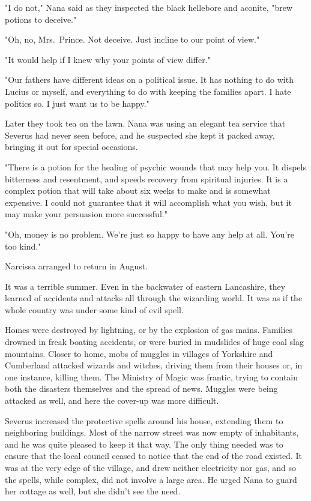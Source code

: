 "I do not," Nana said as they inspected the black hellebore and aconite, "brew potions to deceive."

"Oh, no, Mrs.~Prince. Not deceive. Just incline to our point of view."

"It would help if I knew why your points of view differ."

"Our fathers have different ideas on a{\el} political issue. It has nothing to do with Lucius or myself, and everything to do with keeping the families apart. I hate politics so. I just want us to be happy."

Later they took tea on the lawn. Nana was using an elegant tea service that Severus had never seen before, and he suspected she kept it packed away, bringing it out for special occasions.

"There is a potion for the healing of psychic wounds that may help you. It dispels bitterness and resentment, and speeds recovery from spiritual injuries. It is a complex potion that will take about six weeks to make and is somewhat expensive. I could not guarantee that it will accomplish what you wish, but it may make your persuasion more successful."

"Oh, money is no problem. We're just so happy to have any help at all. You're too kind."

Narcissa arranged to return in August.

It was a terrible summer. Even in the backwater of eastern Lancashire, they learned of accidents and attacks all through the wizarding world. It was as if the whole country was under some kind of evil spell.

Homes were destroyed by lightning, or by the explosion of gas mains. Families drowned in freak boating accidents, or were buried in mudslides of huge coal slag mountains. Closer to home, mobs of muggles in villages of Yorkshire and Cumberland attacked wizards and witches, driving them from their houses or, in one instance, killing them. The Ministry of Magic was frantic, trying to contain both the disasters themselves and the spread of news. Muggles were being attacked as well, and here the cover-up was more difficult.

Severus increased the protective spells around his house, extending them to neighboring buildings. Most of the narrow street was now empty of inhabitants, and he was quite pleased to keep it that way. The only thing needed was to ensure that the local council ceased to notice that the end of the road existed. It was at the very edge of the village, and drew neither electricity nor gas, and so the spells, while complex, did not involve a large area. He urged Nana to guard her cottage as well, but she didn't see the need.

